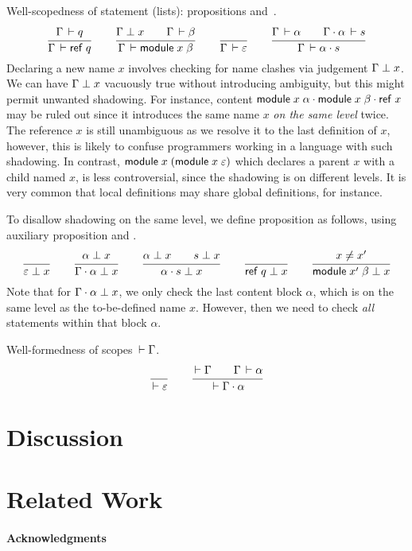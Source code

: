 \documentclass{article}
\theoremstyle{definition}
\theoremstyle{plain}
\theoremstyle{remark}
\begin{document}
Well-scopedness of statement (lists): propositions
  and
\fbox{$\WContent \Gamma \alpha$}\,.
\begin{gather*}
  \ru{\Declares \Gamma q}{\WContent \Gamma {\mref q}}
\qquad
  \ru{\NoClash \Gamma x \qquad \WContent \Gamma \beta
    }{\WContent \Gamma {\mdef x \beta}
    }
\qquad
  \ru{}{\WContent \Gamma \Ge}
\qquad
  \ru{\WContent \Gamma \alpha \qquad
      \WContent {\Gamma \sep \alpha} s
    }{\WContent \Gamma {\alpha \sep s}
    }
\end{gather*}
Declaring a new name $x$ involves checking for name clashes via judgement
$\Gamma \perp x$.  We can have $\Gamma \perp x$ vacuously true
without introducing ambiguity, but this might permit unwanted
shadowing.
For instance, content $\mathsf{module}\;x\;\alpha \cdot \mathsf{module}\;x\;\beta \cdot \mathsf{ref}\;x$ may be ruled out
since it introduces the same name $x$ \emph{on the same level} twice.
The reference $x$ is still unambiguous as we resolve it to the last
definition of $x$, however, this is likely to confuse programmers
working in a language with such shadowing.
In contrast, $\mathsf{module}\;x\;(\mathsf{module}\;x\;\varepsilon)$ which declares a
parent $x$ with a child named $x$, is less controversial, since the
shadowing is on different levels.  It is very common that local
definitions may share global definitions, for instance.

To disallow shadowing on the same level, we define proposition
 as follows, using auxiliary proposition
 and
.
\begin{gather*}
  \ru{}{\NoClash \Ge x}
\qquad
  \ru{\NoClash \alpha x
    }{\NoClash {\Gamma \sep \alpha} x}
\qquad
  \ru{\NoClash \alpha x \qquad \NoClash s x
    }{\NoClash {\alpha \sep s} x}
\qquad
  \ru{}{\NoClash {\mref q} x}
\qquad
  \ru{x \not= x'
    }{\NoClash {\mdef {x'} \beta} x}
\end{gather*}
Note that for $\Gamma \cdot \alpha \perp x$,
we only check the last content block $\alpha$,
which is on the same level as the to-be-defined name $x$.
However, then we need to check \emph{all} statements within that block
$\alpha$.

Well-formedness of scopes $\,\vdash\Gamma$.
\begin{gather*}
  \ru{}{\WScope \Ge}
\qquad
  \ru{\WScope \Gamma \qquad \WContent \Gamma \alpha
    }{\WScope {\Gamma \sep \alpha}}
\end{gather*}

\section{Discussion}

\section{Related Work}

\paragraph*{Acknowledgments}



\end{document}
